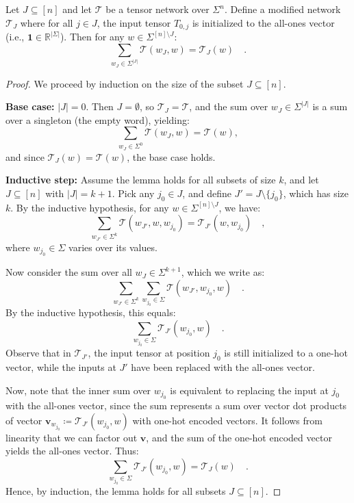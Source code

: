\documentclass[../../main.tex]{subfiles}
\begin{document}
    \begin{lemma}
        \label{lemma:normalized_tensor_networks}
        Let $J \subseteq [n]$ and let $\mathcal{T}$ be a tensor network over $\Sigma^n$. Define a modified network $\mathcal{T}_J$ where for all $j \in J$, the input tensor $T_{0,j}$ is initialized to the all-ones vector (i.e., $\mathbf{1} \in \mathbb{R}^{|\Sigma|}$). Then for any $w \in \Sigma^{[n] \setminus J}$:
        \[
            \sum_{w_J \in \Sigma^{|J|}} \mathcal{T}(w_J, w) = \mathcal{T}_J(w) \quad .
        \]
    \end{lemma}
    \begin{proof}
    We proceed by induction on the size of the subset \( J \subseteq [n] \).

    \textbf{Base case:} \( |J| = 0 \).  
    Then \( J = \emptyset \), so \( \mathcal{T}_J = \mathcal{T} \), and the sum over \( w_J \in \Sigma^{|J|} \) is a sum over a singleton (the empty word), yielding:
    \[
        \sum_{w_J \in \Sigma^0} \mathcal{T}(w_J, w) = \mathcal{T}(w),
    \]
    and since \( \mathcal{T}_J(w) = \mathcal{T}(w) \), the base case holds.

    \textbf{Inductive step:}  
    Assume the lemma holds for all subsets of size \( k \), and let \( J \subseteq [n] \) with \( |J| = k+1 \). Pick any \( j_0 \in J \), and define \( J' = J \setminus \{j_0\} \), which has size \( k \). By the inductive hypothesis, for any \( w \in \Sigma^{[n] \setminus J} \), we have:
    \[
        \sum_{w_{J'} \in \Sigma^{k}} \mathcal{T}(w_{J'}, w, w_{j_0}) = \mathcal{T}_{J'}(w, w_{j_0}) \quad ,
    \]
    where \( w_{j_0} \in \Sigma \) varies over its values.

    Now consider the sum over all \( w_J \in \Sigma^{k+1} \), which we write as:
    \[
        \sum_{w_{J'} \in \Sigma^k} \sum_{w_{j_0} \in \Sigma} \mathcal{T}(w_{J'}, w_{j_0}, w) \quad .
    \]
    By the inductive hypothesis, this equals:
    \[
        \sum_{w_{j_0} \in \Sigma} \mathcal{T}_{J'}(w_{j_0}, w) \quad .
    \]
    Observe that in \( \mathcal{T}_{J'} \), the input tensor at position \( j_0 \) is still initialized to a one-hot vector, while the inputs at \( J' \) have been replaced with the all-ones vector.

    Now, note that the inner sum over \( w_{j_0} \) is equivalent to replacing the input at \( j_0 \) with the all-ones vector, since the sum represents a sum over vector dot products of vector $\bm{v}_{w_{j_0}} \coloneqq \mathcal{T}_{J'}(w_{j_0}, w)$ with one-hot encoded vectors. It follows from linearity that we can factor out $\bm{v}$, and the sum of the one-hot encoded vector yields the all-ones vector. Thus:
    \[
        \sum_{w_{j_0} \in \Sigma} \mathcal{T}_{J'}(w_{j_0}, w) = \mathcal{T}_J(w) \quad .
    \]
    Hence, by induction, the lemma holds for all subsets \( J \subseteq [n] \).

    \end{proof}
\end{document}
